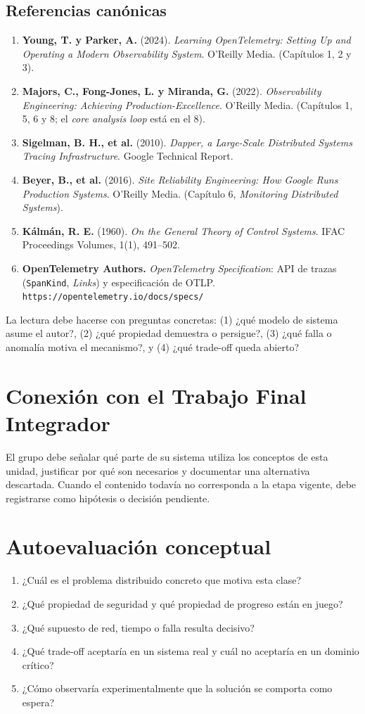 \documentclass[variant=apuntes,cover=institutional,mode=screen]{ua-engineering-v6-article}
\begin{document}
\subsection*{Referencias canónicas}
\begin{enumerate}
\item \textbf{Young, T. y Parker, A.} (2024). \emph{Learning OpenTelemetry: Setting Up and Operating a Modern Observability System}. O'Reilly Media. (Capítulos 1, 2 y 3).
\item \textbf{Majors, C., Fong-Jones, L. y Miranda, G.} (2022). \emph{Observability Engineering: Achieving Production-Excellence}. O'Reilly Media. (Capítulos 1, 5, 6 y 8; el \emph{core analysis loop} está en el 8).
\item \textbf{Sigelman, B. H., et al.} (2010). \emph{Dapper, a Large-Scale Distributed Systems Tracing Infrastructure}. Google Technical Report.
\item \textbf{Beyer, B., et al.} (2016). \emph{Site Reliability Engineering: How Google Runs Production Systems}. O'Reilly Media. (Capítulo 6, \emph{Monitoring Distributed Systems}).
\item \textbf{Kálmán, R. E.} (1960). \emph{On the General Theory of Control Systems}. IFAC Proceedings Volumes, 1(1), 491--502.
\item \textbf{OpenTelemetry Authors.} \emph{OpenTelemetry Specification}: API de trazas (\texttt{SpanKind}, \emph{Links}) y especificación de OTLP. \texttt{https://opentelemetry.io/docs/specs/}
\end{enumerate}

La lectura debe hacerse con preguntas concretas: (1) ¿qué modelo de sistema asume el autor?, (2) ¿qué propiedad demuestra o persigue?, (3) ¿qué falla o anomalía motiva el mecanismo?, y (4) ¿qué trade-off queda abierto?

\section{Conexión con el Trabajo Final Integrador}
El grupo debe señalar qué parte de su sistema utiliza los conceptos de esta unidad, justificar por qué son necesarios y documentar una alternativa descartada. Cuando el contenido todavía no corresponda a la etapa vigente, debe registrarse como hipótesis o decisión pendiente.

\section{Autoevaluación conceptual}
\begin{enumerate}
\item ¿Cuál es el problema distribuido concreto que motiva esta clase?
\item ¿Qué propiedad de seguridad y qué propiedad de progreso están en juego?
\item ¿Qué supuesto de red, tiempo o falla resulta decisivo?
\item ¿Qué trade-off aceptaría en un sistema real y cuál no aceptaría en un dominio crítico?
\item ¿Cómo observaría experimentalmente que la solución se comporta como espera?
\end{enumerate}
\end{document}
